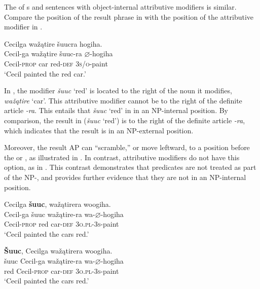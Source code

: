 \documentclass[output=paper]{LSP/langsci}
\begin{document}
The  of s and sentences with object-internal attributive modifiers is similar. Compare the position of the result phrase in  with the position of the attributive modifier in .

\begin{exe}
\ex\label{ex:rosen:8}
 \glll Cecilga wažątire šuucra hogiha. \\
Cecil-ga  wažątire šuuc-ra  {$\varnothing$}-hogiha\\
Cecil-\textsc{prop} car red-\textsc{def}  \textsc{3s/o}-paint\\
\glt `Cecil painted the red car.'

\end{exe}

In , the modifier \textit{šuuc} `red' is located to the right of the noun it modifies, \textit{wažątire} `car'. This attributive modifier cannot be to the right of the definite article \textit{-ra}. This entails that \textit{šuuc} `red' in  in an NP-internal position. By comparison, the result in  (\textit{šuuc} `red') is to the right of the definite article \textit{-ra}, which indicates that the result is in an NP-external position.

Moreover, the result AP can ``scramble,'' or move leftward, to a position before the  or , as illustrated in . In contrast, attributive modifiers do not have this option, as in . This contrast demonstrates that  predicates are not treated as part of the NP-, and provides further evidence that they are not in an NP-internal position.

\begin{exe}
\ex\label{ex:rosen:9}
\begin{xlist}

\ex \glll Cecilga \textbf{šuuc}, wažątirera woogiha. \\
 Cecil-ga šuuc  wažątire-ra wa-{$\varnothing$}-hogiha\\
 Cecil-\textsc{prop} red car-\textsc{def} \textsc{3o.pl}-\textsc{3s}-paint \\
\glt `Cecil painted the cars red.'

\ex \glll \textbf{\v{S}uuc}, Cecilga wažątirera woogiha. \\
  šuuc Cecil-ga wažątire-ra wa-{$\varnothing$}-hogiha\\
red Cecil-\textsc{prop} car-\textsc{def} \textsc{3o.pl}-\textsc{3s}-paint \\
\glt `Cecil painted the cars red.'

\end{xlist}




\end{exe}
\end{document}
